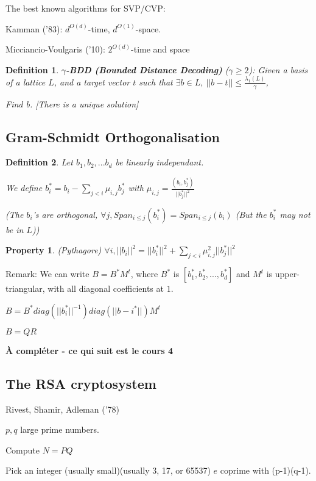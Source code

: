 \documentclass[a4paper,10pt]{article}
\newtheorem{definition}{Definition}
\newtheorem{proposition}{Property}
\begin{document}
The best known algorithms for SVP/CVP:

Kamman ('83): $d^{O(d)}$-time, $d^{O(1)}$-space.

Micciancio-Voulgaris ('10): $2^{O(d)}$-time and space

\begin{definition}
\textbf{$\gamma$-BDD (Bounded Distance Decoding)} ($\gamma \geq 2$): Given a basis of a lattice $L$, and a target vector $t$ such that $\exists b \in L, \ ||b-t|| \leq \frac{\lambda_1(L)}{\gamma}$,

Find b.
[There is a unique solution]
\end{definition}

\subsection{Gram-Schmidt Orthogonalisation}

\begin{definition}
Let $b_1,b_2,...b_d$ be linearly independant.

We define $b_i^* = b_i - \sum_{j < i} \mu_{i,j} b_j^*$ with $\mu_{i,j} = \frac{(b_i,b_j^*)}{||b_j^*||^2}$

(The $b_i$'s are orthogonal, $\forall j, Span_{i \leq j}(b_i^*)=Span_{i \leq j}(b_i)$ (But the $b_i^*$ may not be in $L$))
\end{definition}

\begin{proposition}(Pythagore)
$\forall i, ||b_i||^2 = ||b_i^*||^2+\sum_{j<i} \mu_{i,j}^2 ||b_j^*||^2$
\end{proposition}

Remark: We can write $B= B^* M^t$, where $B^*$ is $[b_1^*,b_2^*,...,b_d^*]$ and $M^t$ is upper-triangular, with all diagonal coefficients at $1$.

$B = B^* diag(||b_i^*||^{-1}) diag(||b-i^*||) M^t$

$B= Q R$

\textbf{À compléter - ce qui suit est le cours 4}

\subsection{The RSA cryptosystem}

Rivest, Shamir, Adleman ('78)

$p, q$ large prime numbers.

Compute $N= P Q$

Pick an integer (usually small)(usually 3, 17, or 65537) $e$ coprime with (p-1)(q-1).
\end{document}
